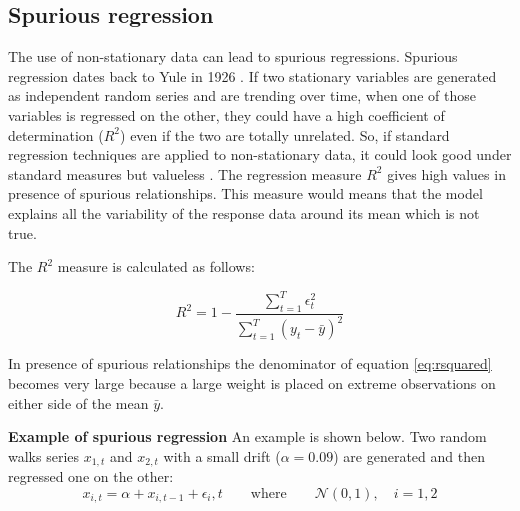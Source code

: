 \subsection{Spurious regression} \label{sec:spurious}
The use of non-stationary data can lead to spurious regressions. Spurious
regression dates back to Yule in 1926 \cite{yule1926}. If two stationary
variables are generated as independent random series and are trending over time,
when one of those variables is regressed on the other, they could have a high
coefficient of determination ($R^2$) even if the two are totally unrelated. So,
if standard regression techniques are applied to non-stationary data, it could
look good under standard measures but valueless \cite{brooks2002}.
The regression measure $R^2$ gives high values in presence of spurious
relationships. This measure would means that the model explains all the
variability of the response data around its mean which is not true. 

The $R^2$ measure is calculated as follows:

\begin{equation}
\label{eq:rsquared}
R^2 = 1 - \frac{\sum_{t=1}^T \epsilon_t^2}{\sum_{t=1}^T(y_t - \bar{y})^2}
\end{equation}

In presence of spurious relationships the denominator of equation
\ref{eq:rsquared} becomes very large because a large weight is placed on
extreme observations on either side of the mean $\bar{y}$.

\vspace{15mm}
\textbf{Example of spurious regression} \quad 
An example is shown below. Two random walks series $x_{1,t}$ and $x_{2,t}$ with
a small drift ($\alpha=0.09$) are generated and then regressed one on the
other:
 \begin{equation}
 x_{i,t} = \alpha + x_{i,t-1} + \epsilon_i,t  \qquad \text{where} \qquad
\mathcal{N}(0,1), \quad i=1,2
 \end{equation}

